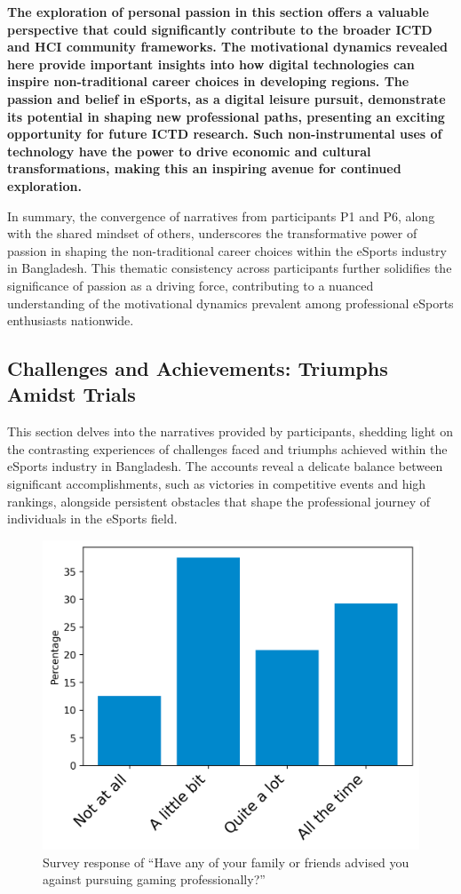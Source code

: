 \documentclass[manuscript,screen,review,anonymous]{acmart}
\begin{document}
\textbf{The exploration of personal passion in this section offers a valuable perspective that could significantly contribute to the broader ICTD and HCI community frameworks. The motivational dynamics revealed here provide important insights into how digital technologies can inspire non-traditional career choices in developing regions. The passion and belief in eSports, as a digital leisure pursuit, demonstrate its potential in shaping new professional paths, presenting an exciting opportunity for future ICTD research. Such non-instrumental uses of technology have the power to drive economic and cultural transformations, making this an inspiring avenue for continued exploration.}

In summary, the convergence of narratives from participants P1 and P6, along with the shared mindset of others, underscores the transformative power of passion in shaping the non-traditional career choices within the eSports industry in Bangladesh. This thematic consistency across participants further solidifies the significance of passion as a driving force, contributing to a nuanced understanding of the motivational dynamics prevalent among professional eSports enthusiasts nationwide.





\subsection{Challenges and Achievements: Triumphs Amidst Trials}

This section delves into the narratives provided by participants, shedding light on the contrasting experiences of challenges faced and triumphs achieved within the eSports industry in Bangladesh. The accounts reveal a delicate balance between significant accomplishments, such as victories in competitive events and high rankings, alongside persistent obstacles that shape the professional journey of individuals in the eSports field.

\begin{figure}[h]
  \centering
  \includegraphics[width=0.35\columnwidth]{EA2.png}
  \caption{Survey response of ``Have any of your family or friends advised you against pursuing gaming professionally?''}
  \label{fig:ea2}
\end{figure}
\end{document}
